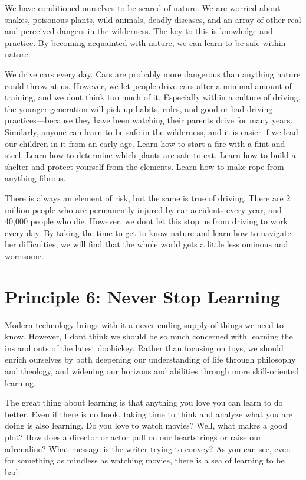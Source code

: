 We have conditioned ourselves to be scared of nature. We are worried
about snakes, poisonous plants, wild animals, deadly diseases, and an
array of other real and perceived dangers in the wilderness. The key to
this is knowledge and practice. By becoming acquainted with nature, we
can learn to be safe within nature. 


We drive cars every day. Cars are probably more dangerous than anything
nature could throw at us. However, we let people drive cars after a
minimal amount of training, and
we
don{\textquotesingle}t think too much of it. Especially
within a culture of
driving, the younger
generation will pick up habits, rules, and good or bad driving
practices—because they have been watching their parents drive for many
years. Similarly, anyone can learn to be safe in the wilderness, and
it is easier if we lead our children in it from an early age. Learn how
to start a fire with a flint and steel. Learn how to determine which
plants are safe to eat. Learn how to build a shelter and protect
yourself from the elements. Learn how to make rope from anything
fibrous. 


There is always an element of risk, but the same is true of driving.
There are 2 million people who are permanently injured by car accidents
every year, and 40,000 people who die. However, we
don{\textquotesingle}t let this stop us from driving to work every day.
By taking the time to get to know nature and learn how to navigate her
difficulties, we will find that the whole world gets a little less
ominous and worrisome. 

\section{Principle 6: Never Stop
Learning}

Modern technology brings with it a never-ending supply of things we need
to know. However, I don{\textquotesingle}t think we should be so much
concerned with learning the ins and outs of the latest doohickey.
Rather than focusing on toys, we should enrich ourselves by both
deepening our understanding of life through philosophy and theology,
and widening our horizons and abilities through more skill-oriented
learning.


The great thing about learning is that anything you love you can learn
to do better. Even if there is no book, taking time to think and
analyze what you are doing is also learning. Do you love to watch
movies? Well, what makes a good plot?  How does a director or actor
pull on our heartstrings or raise our adrenaline?  What message is the
writer trying to convey?  As you can see, even for something as
mindless as watching movies, there is a sea of learning to be had.


